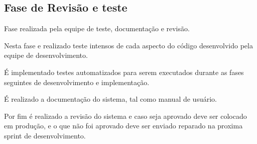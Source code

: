 
\subsection*{Fase de Revisão e teste}

Fase realizada pela equipe de teste, documentação e revisão.

Nesta fase e realizado teste intensos de cada aspecto do código desenvolvido pela equipe de desenvolvimento. 

É implementado testes automatizados para serem executados durante as fases seguintes de desenvolvimento e implementação.

É realizado a documentação do sistema, tal como manual de usuário.

Por fim é realizado a revisão do sistema e caso seja aprovado deve ser colocado em produção, e o que não foi aprovado deve ser enviado reparado na proxima sprint de desenvolvimento. 



